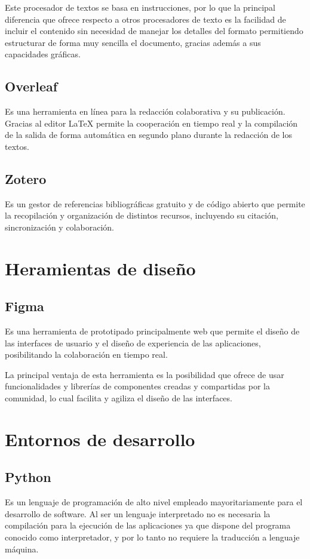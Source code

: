 Este procesador de textos se basa en instrucciones, por lo que la principal diferencia que ofrece respecto a otros procesadores de texto es la facilidad de incluir el contenido sin necesidad de manejar los detalles del formato permitiendo estructurar de forma muy sencilla el documento, gracias además a sus capacidades gráficas.

\subsection{Overleaf}
\cite{Overleaf_bib} Es una herramienta en línea para la redacción colaborativa y su publicación. Gracias al editor LaTeX permite la cooperación en tiempo real y la compilación de la salida de forma automática en segundo plano durante la redacción de los textos.

\subsection{Zotero}
\cite{Zotero_bib} Es un gestor de referencias bibliográficas gratuito y de código abierto que permite la recopilación y organización de distintos recursos, incluyendo su citación, sincronización y colaboración. 

\section{Heramientas de diseño}
\subsection{Figma}
\cite{Figma1_bib} Es una herramienta de prototipado principalmente web que permite el diseño de las interfaces de usuario y el diseño de experiencia de las aplicaciones, posibilitando la colaboración en tiempo real.

\cite{Figma2_bib} La principal ventaja de esta herramienta es la posibilidad que ofrece de usar funcionalidades y librerías de componentes creadas y compartidas por la comunidad, lo cual facilita y agiliza el diseño de las interfaces.

\section{Entornos de desarrollo}
 \subsection{Python}
\cite{Python1_bib} Es un lenguaje de programación de alto nivel empleado mayoritariamente para el desarrollo de software. \cite{Python2_bib} Al ser un lenguaje interpretado no es necesaria la compilación para la ejecución de las aplicaciones ya que dispone del programa conocido como interpretador, y por lo tanto no requiere la traducción a lenguaje máquina.

